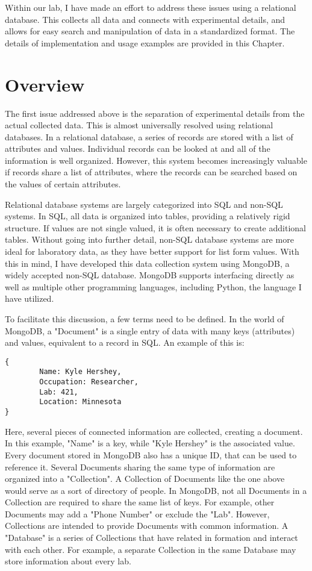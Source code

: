 \documentclass[../thesis.tex]{subfiles}
\begin{document}
Within our lab, I have made an effort to address these issues using a relational database.
This collects all data and connects with experimental details, and allows for easy search and manipulation of data in a standardized format.
The details of implementation and usage examples are provided in this Chapter.

\section{Overview}

The first issue addressed above is the separation of experimental details from the actual collected data.  
This is almost universally resolved using relational databases.
In a relational database, a series of records are stored with a list of attributes and values.
Individual records can be looked at and all of the information is well organized.
However, this system becomes increasingly valuable if records share a list of attributes, where the records can be searched based on the values of certain attributes.

Relational database systems are largely categorized into SQL and non-SQL systems.
In SQL, all data is organized into tables, providing a relatively rigid structure.
If values are not single valued, it is often necessary to create additional tables.
Without going into further detail, non-SQL database systems are more ideal for laboratory data, as they have better support for list form values.
With this in mind, I have developed this data collection system using MongoDB, a widely accepted non-SQL database.
MongoDB supports interfacing directly as well as multiple other programming languages, including Python, the language I have utilized.

To facilitate this discussion, a few terms need to be defined.  
In the world of MongoDB, a "Document" is a single entry of data with many keys (attributes) and values, equivalent to a record in SQL.
An example of this is:

\begin{lstlisting}
{
        Name: Kyle Hershey,
        Occupation: Researcher,
        Lab: 421,
        Location: Minnesota
}
\end{lstlisting}

Here, several pieces of connected information are collected, creating a document.
In this example, "Name" is a key, while "Kyle Hershey" is the associated value.
Every document stored in MongoDB also has a unique ID, that can be used to reference it.
Several Documents sharing the same type of information are organized into a "Collection".
A Collection of Documents like the one above would serve as a sort of directory of people.
In MongoDB, not all Documents in a Collection are required to share the same list of keys.  
For example, other Documents may add a "Phone Number" or exclude the "Lab".
However, Collections are intended to provide Documents with common information.
A "Database" is a series of Collections that have related in formation and interact with each other.
For example, a separate Collection in the same Database may store information about every lab.
\end{document}
